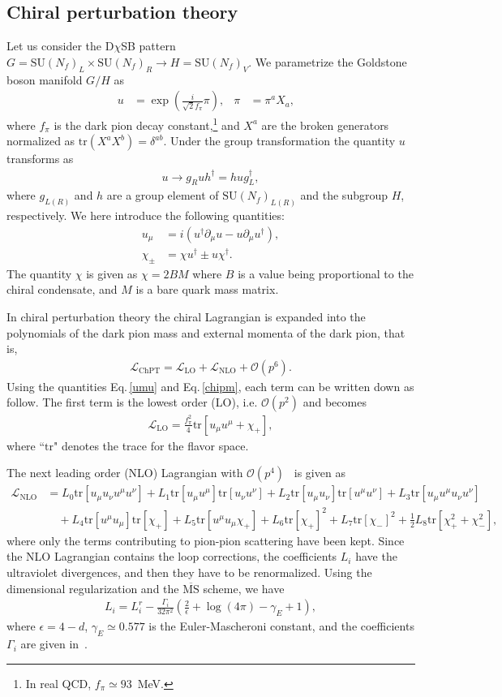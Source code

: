 \documentclass[a4paper,preprint,superscriptaddress,preprintnumbers,nofootinbib]{revtex4}
\newcommand{\SU}{\text{SU}}
\newcommand{\al}[1]{\begin{align}#1\end{align}}
\newcommand{\nn}{\nonumber\\}
\newcommand{\p}{\partial}
\newcommand{\fn}[1]{\!\left(#1\right)}
\newcommand{\Lag}{\mathcal L}
\newcommand{\tr}{\text{tr}}
\begin{document}
\subsection{Chiral perturbation theory}
Let us consider the D$\chi$SB pattern $G=\SU\fn{N_f}_L\times \SU\fn{N_f}_R \to H=\SU\fn{N_f}_V$.
We parametrize the Goldstone boson manifold $G/H$ as
\al{
u&=\exp\fn{\frac{i}{\sqrt{2}f_\pi}\pi},&
\pi&=\pi^aX_a,&
\label{GB parametrize}
}
where $f_\pi$ is the dark pion decay constant,\footnote{
In real QCD, $f_\pi\simeq 93$\, MeV.
}
and $X^a$ are the broken generators normalized as $\tr (X^aX^b)=\delta^{ab}$.
Under the group transformation the quantity $u$ transforms as
\al{
u\to g_R u h^\dagger=h ug_L^\dagger,
}
where $g_{L(R)}$ and $h$ are a group element of $\SU\fn{N_f}_{L(R)}$ and the subgroup $H$, respectively.
We here introduce the following quantities:
\al{
u_\mu&=i(u^\dagger \p_\mu u-u\p_\mu u^\dagger),
\label{umu}
\\
\chi_\pm&=\chi u^\dagger \pm u\chi^\dagger.
\label{chipm}
}
The quantity $\chi$ is given as $\chi=2B M$ where $B$ is a value being proportional to the chiral condensate, and $M$ is a bare quark mass matrix.

In {chiral perturbation theory} the chiral Lagrangian is expanded into the polynomials of the dark pion mass and external momenta of the dark pion, that is,
\al{
\Lag_\text{ChPT}=\Lag_\text{LO} +\Lag_\text{NLO} + {\mathcal O}\fn{p^6}.
}
Using the quantities Eq.\,\eqref{umu} and Eq.\,\eqref{chipm}, each term can be written down as follow.
The first term is the lowest order (LO), i.e. ${\mathcal O}\fn{p^2}$ and becomes
\al{
\Lag_\text{LO} =\frac{f_\pi^2}{4}\tr[ u_\mu u^\mu +\chi_+ ],
}
where ``$\tr$" denotes the trace for the flavor space.

The next leading order (NLO) Lagrangian with ${\mathcal O}\fn{p^4}$~\cite{Gasser:1984gg} is given as
\al{
\Lag_\text{NLO} &=L_0\tr[ u_\mu u_\nu u^\mu u^\nu] 
+L_1\tr[ u_\mu u^\mu ] \tr[ u_\nu u^\nu]
+L_2\tr[ u_\mu u_\nu ] \tr[ u^\mu u^\nu]
+L_3\tr[ u_\mu u^\mu u_\nu u^\nu] \nn
&\quad
+L_4\tr[ u^\mu u_\mu] \tr[ \chi_+]
+L_5\tr[ u^\mu u_\mu \chi_+]
+L_6\tr[ \chi_+]^2
+L_7\tr[ \chi_-] ^2
+\frac{1}{2}L_8\tr[ \chi_+^2+\chi_-^2],
}
where only the terms contributing to {pion-pion scattering} have been kept.
Since the NLO Lagrangian contains the loop corrections, the coefficients $L_i$ have the ultraviolet divergences, and then they have to be renormalized.
Using the dimensional regularization and the $\overline{\text{MS}}$ scheme, we have
\al{
L_i=L_i^r-\frac{\Gamma_i}{32\pi^2}\left(\frac{2}{\epsilon} +\log\fn{4\pi}-\gamma_E+1 \right),
}
where $\epsilon=4-d$, $\gamma_E\simeq 0.577$ is the {Euler}-Mascheroni constant, and the coefficients $\Gamma_i$ are given in~\cite{Gasser:1983yg,Bijnens:2009qm}.
\end{document}
